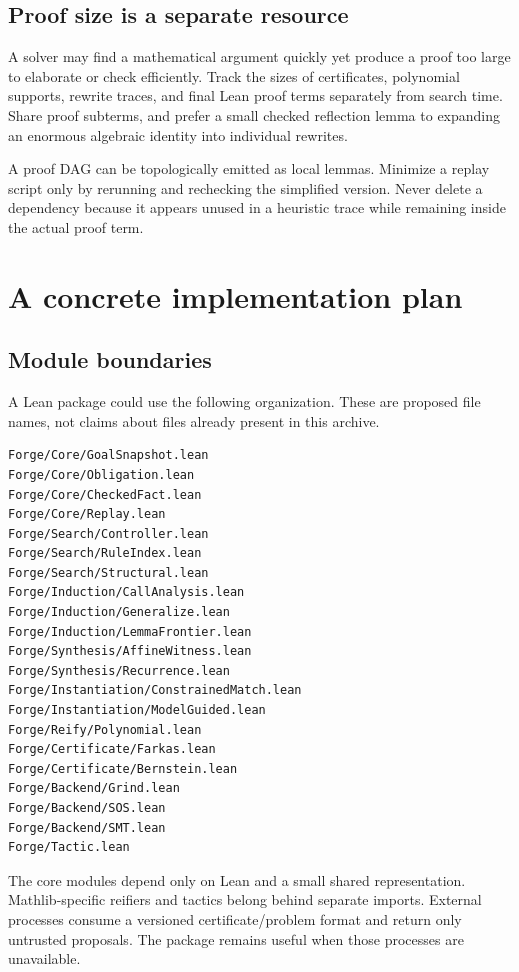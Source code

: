 \subsection{Proof size is a separate resource}

A solver may find a mathematical argument quickly yet produce a proof too
large to elaborate or check efficiently. Track the sizes of certificates,
polynomial supports, rewrite traces, and final Lean proof terms separately
from search time. Share proof subterms, and prefer a small checked reflection
lemma to expanding an enormous algebraic identity into individual rewrites.

A proof DAG can be topologically emitted as local lemmas. Minimize a replay
script only by rerunning and rechecking the simplified version. Never delete
a dependency because it appears unused in a heuristic trace while remaining
inside the actual proof term.

\section{A concrete implementation plan}

\subsection{Module boundaries}

A Lean package could use the following organization. These are proposed file
names, not claims about files already present in this archive.
\begin{lstlisting}
Forge/Core/GoalSnapshot.lean
Forge/Core/Obligation.lean
Forge/Core/CheckedFact.lean
Forge/Core/Replay.lean
Forge/Search/Controller.lean
Forge/Search/RuleIndex.lean
Forge/Search/Structural.lean
Forge/Induction/CallAnalysis.lean
Forge/Induction/Generalize.lean
Forge/Induction/LemmaFrontier.lean
Forge/Synthesis/AffineWitness.lean
Forge/Synthesis/Recurrence.lean
Forge/Instantiation/ConstrainedMatch.lean
Forge/Instantiation/ModelGuided.lean
Forge/Reify/Polynomial.lean
Forge/Certificate/Farkas.lean
Forge/Certificate/Bernstein.lean
Forge/Backend/Grind.lean
Forge/Backend/SOS.lean
Forge/Backend/SMT.lean
Forge/Tactic.lean
\end{lstlisting}

The core modules depend only on Lean and a small shared representation.
Mathlib-specific reifiers and tactics belong behind separate imports.
External processes consume a versioned certificate/problem format and return
only untrusted proposals. The package remains useful when those processes
are unavailable.

